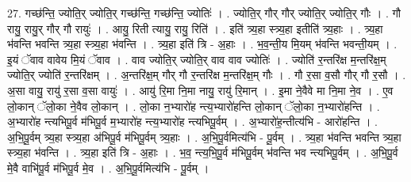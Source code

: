 \documentclass[17pt]{extarticle}
\begin{document}
27. गच्छ॑न्ति॒ ज्योति॒र् ज्योति॒र् गच्छ॑न्ति॒ गच्छ॑न्ति॒ ज्योतिः॑ । . ज्योति॒र् गौर् गौर् ज्योति॒र् ज्योति॒र् गौः । . गौ रायु॒ रायु॒र् गौर् गौ रायुः॑ । . आयु॒ रिती त्यायु॒ रायु॒ रिति॑ । . इति॑ त्र्य॒हा स्त्र्य॒हा इतीति॑ त्र्य॒हाः । . त्र्य॒हा भ॑वन्ति भवन्ति त्र्य॒हा स्त्र्य॒हा भ॑वन्ति । . त्र्य॒हा इति॑ त्रि - अ॒हाः । . भ॒व॒न्ती॒य मि॒यम् भ॑वन्ति भवन्ती॒यम् । . इ॒यं ॅवाव वावेय मि॒यं ॅवाव । . वाव ज्योति॒र् ज्योति॒र् वाव वाव ज्योतिः॑ । . ज्योति॑ र॒न्तरि॑क्ष म॒न्तरि॑क्ष॒म् ज्योति॒र् ज्योति॑ र॒न्तरि॑क्षम् । . अ॒न्तरि॑क्ष॒म् गौर् गौ र॒न्तरि॑क्ष म॒न्तरि॑क्ष॒म् गौः । . गौ र॒सा व॒सौ गौर् गौ र॒सौ । . अ॒सा वायु॒ रायु॑ र॒सा व॒सा वायुः॑ । . आयु॑ रि॒मा नि॒मा नायु॒ रायु॑ रि॒मान् । . इ॒मा ने॒वैवे मा नि॒मा ने॒व । . ए॒व लो॒कान् ॅलो॒का ने॒वैव लो॒कान् । . लो॒का न॒भ्यारो॑ह न्त्य॒भ्यारो॑हन्ति लो॒कान् ॅलो॒का न॒भ्यारो॑हन्ति । . अ॒भ्यारो॑ह न्त्यभिपू॒र्व म॑भिपू॒र्व म॒भ्यारो॑ह न्त्य॒भ्यारो॑ह न्त्यभिपू॒र्वम् । . अ॒भ्यारो॑ह॒न्तीत्य॑भि - आरो॑हन्ति । . अ॒भि॒पू॒र्वम् त्र्य॒हा स्त्र्य॒हा अ॑भिपू॒र्व म॑भिपू॒र्वम् त्र्य॒हाः । . अ॒भि॒पू॒र्वमित्य॑भि - पू॒र्वम् । . त्र्य॒हा भ॑वन्ति भवन्ति त्र्य॒हा स्त्र्य॒हा भ॑वन्ति । . त्र्य॒हा इति॑ त्रि - अ॒हाः । . भ॒व॒ न्त्य॒भि॒पू॒र्व म॑भिपू॒र्वम् भ॑वन्ति भव न्त्यभिपू॒र्वम् । . अ॒भि॒पू॒र्व मे॒वै वाभि॑पू॒र्व म॑भिपू॒र्व मे॒व । . अ॒भि॒पू॒र्वमित्य॑भि - पू॒र्वम् । \newline
\end{document}
